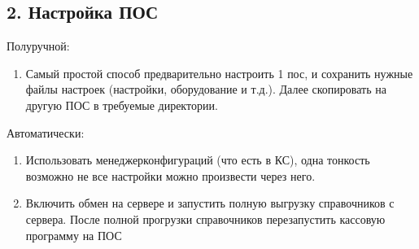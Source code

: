 \documentclass[a4paper,10pt,russian]{report}
\begin{document}
\subsection{2. Настройка ПОС}
\label{\detokenize{kass:id3}}
\sphinxAtStartPar
Полуручной:
\begin{enumerate}
%
\item {} 
\sphinxAtStartPar
Самый простой способ предварительно настроить 1 пос, и сохранить нужные файлы настроек (настройки, оборудование и т.д.). Далее скопировать на другую ПОС в требуемые директории.

\end{enumerate}

\sphinxAtStartPar
Автоматически:
\begin{enumerate}
%
\item {} 
\sphinxAtStartPar
Использовать менеджер\sphinxhyphen{}конфигураций (что есть в КС), одна тонкость \sphinxhyphen{} возможно не все настройки можно произвести через него.

\item {} 
\sphinxAtStartPar
Включить обмен на сервере и запустить полную выгрузку справочников с сервера. После полной прогрузки справочников \sphinxhyphen{} перезапустить кассовую программу на ПОС

\end{enumerate}

\sphinxstepscope
\end{document}
